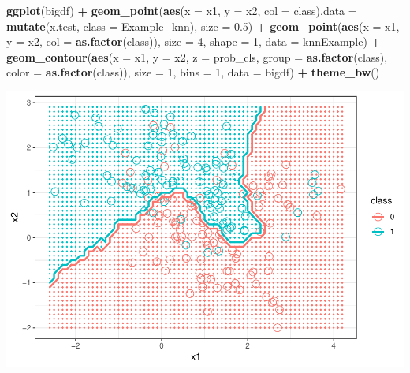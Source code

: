 \documentclass[]{article}
\newenvironment{Shaded}{\begin{snugshade}}{\end{snugshade}}
\newcommand{\KeywordTok}[1]{\textcolor[rgb]{0.13,0.29,0.53}{\textbf{#1}}}
\newcommand{\DataTypeTok}[1]{\textcolor[rgb]{0.13,0.29,0.53}{#1}}
\newcommand{\DecValTok}[1]{\textcolor[rgb]{0.00,0.00,0.81}{#1}}
\newcommand{\FloatTok}[1]{\textcolor[rgb]{0.00,0.00,0.81}{#1}}
\newcommand{\StringTok}[1]{\textcolor[rgb]{0.31,0.60,0.02}{#1}}
\newcommand{\OperatorTok}[1]{\textcolor[rgb]{0.81,0.36,0.00}{\textbf{#1}}}
\newcommand{\NormalTok}[1]{#1}
\begin{document}
\begin{Shaded}
\begin{Highlighting}[]
\KeywordTok{ggplot}\NormalTok{(bigdf) }\OperatorTok{+}\StringTok{ }
\StringTok{    }\KeywordTok{geom_point}\NormalTok{(}\KeywordTok{aes}\NormalTok{(}\DataTypeTok{x =}\NormalTok{ x1, }\DataTypeTok{y =}\NormalTok{ x2, }\DataTypeTok{col =}\NormalTok{ class),}\DataTypeTok{data =} \KeywordTok{mutate}\NormalTok{(x.test, }\DataTypeTok{class =}\NormalTok{ Example_knn), }\DataTypeTok{size =} \FloatTok{0.5}\NormalTok{) }\OperatorTok{+}
\StringTok{    }\KeywordTok{geom_point}\NormalTok{(}\KeywordTok{aes}\NormalTok{(}\DataTypeTok{x =}\NormalTok{ x1, }\DataTypeTok{y =}\NormalTok{ x2, }\DataTypeTok{col =} \KeywordTok{as.factor}\NormalTok{(class)), }\DataTypeTok{size =} \DecValTok{4}\NormalTok{, }\DataTypeTok{shape =} \DecValTok{1}\NormalTok{, }\DataTypeTok{data =}\NormalTok{ knnExample) }\OperatorTok{+}\StringTok{ }
\StringTok{    }\KeywordTok{geom_contour}\NormalTok{(}\KeywordTok{aes}\NormalTok{(}\DataTypeTok{x =}\NormalTok{ x1, }\DataTypeTok{y =}\NormalTok{ x2, }\DataTypeTok{z =}\NormalTok{ prob_cls, }\DataTypeTok{group =} \KeywordTok{as.factor}\NormalTok{(class), }\DataTypeTok{color =} \KeywordTok{as.factor}\NormalTok{(class)), }\DataTypeTok{size =} \DecValTok{1}\NormalTok{, }\DataTypeTok{bins =} \DecValTok{1}\NormalTok{, }\DataTypeTok{data =}\NormalTok{ bigdf) }\OperatorTok{+}\StringTok{ }
\StringTok{    }\KeywordTok{theme_bw}\NormalTok{()}
\end{Highlighting}
\end{Shaded}

\includegraphics{stt-301-programming_files/figure-latex/unnamed-chunk-193-1.pdf}
\end{document}
